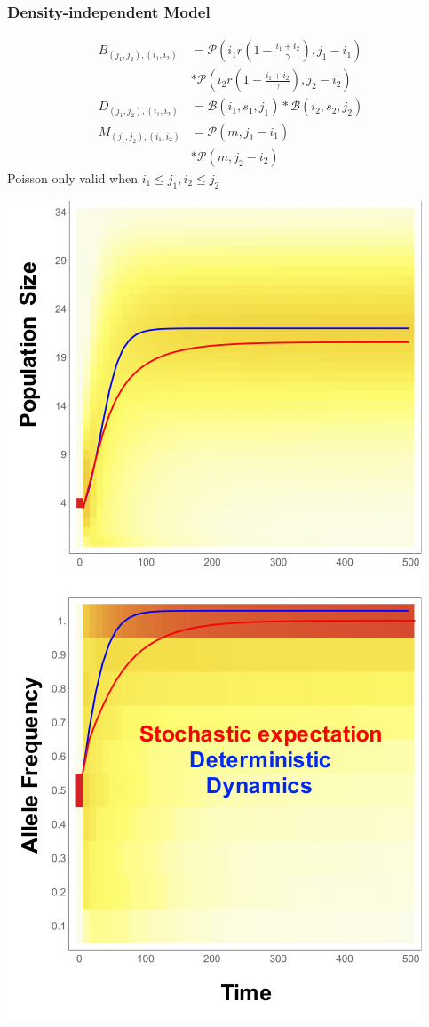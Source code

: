 \documentclass{beamer}
\begin{document}
\begin{frame}
\frametitle{Density-independent Model}
\begin{minipage}{0.45\textwidth}
\tiny
\begin{center}
\end{center}
\begin{equation*}
\begin{aligned}
B_{(j_1,j_2),(i_1,i_2)}&=\mathcal{P}\left(i_1 r(1-\frac{i_1+i_2}{\gamma}),j_1-i_1\right)\\
&*\mathcal{P}\left(i_2 r(1-\frac{i_1+i_2}{\gamma}),j_2-i_2\right)\\
D_{(j_1,j_2),(i_1,i_2)} &=\mathcal{B}\left(i_1,s_1,j_1\right)*\mathcal{B}\left(i_2,s_2,j_2\right)\\
M_{(j_1,j_2),(i_1,i_2)} &=\mathcal{P}\left(m,j_1-i_1\right)\\
&*\mathcal{P}\left(m,j_2-i_2\right)
\end{aligned}
\end{equation*}
Poisson only valid when \(i_1\leq j_1, i_2\leq j_2\)
\normalsize
\end{minipage}%
\begin{minipage}{0.45\textwidth}
\begin{center}
\includegraphics[width=0.7\columnwidth]{DensityIndependent.pdf}
\end{center}
\end{minipage}%
\end{frame}
\end{document}
